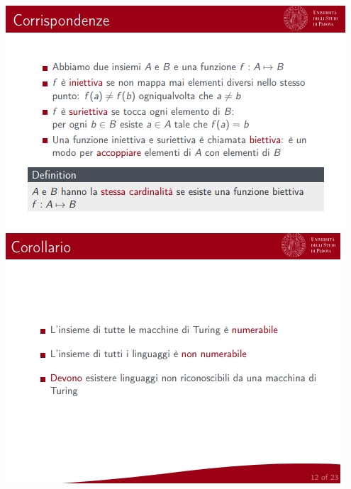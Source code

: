 \documentclass[]{article}
\begin{document}
\begin{center}
					\includegraphics[scale=0.8]{indecidibile3.png}
					\includegraphics[scale=0.8]{indecidibile4.png}

\end{center}
\end{document}
